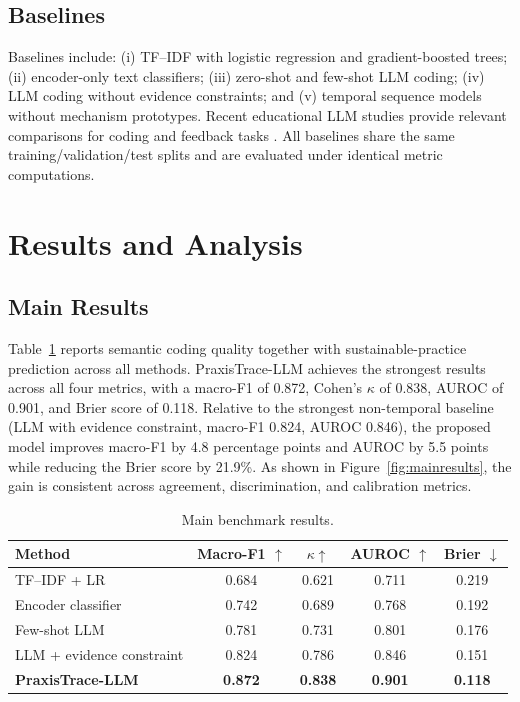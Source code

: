 \documentclass[pdflatex,sn-mathphys-num]{sn-jnl}%
\theoremstyle{thmstyleone}%
\theoremstyle{thmstyletwo}%
\theoremstyle{thmstylethree}%
\begin{document}
\subsection{Baselines}

Baselines include: (i) TF--IDF with logistic regression and gradient-boosted trees; (ii) encoder-only text classifiers; (iii) zero-shot and few-shot LLM coding; (iv) LLM coding without evidence constraints; and (v) temporal sequence models without mechanism prototypes. Recent educational LLM studies provide relevant comparisons for coding and feedback tasks \cite{long2024dialogue,parker2025survey,shin2025cocoding,wang2025bertllama}. All baselines share the same training/validation/test splits and are evaluated under identical metric computations.

\section{Results and Analysis}

\subsection{Main Results}

Table~\ref{tab:main} reports semantic coding quality together with sustainable-practice prediction across all methods. PraxisTrace-LLM achieves the strongest results across all four metrics, with a macro-F1 of 0.872, Cohen's $\kappa$ of 0.838, AUROC of 0.901, and Brier score of 0.118. Relative to the strongest non-temporal baseline (LLM with evidence constraint, macro-F1 0.824, AUROC 0.846), the proposed model improves macro-F1 by 4.8 percentage points and AUROC by 5.5 points while reducing the Brier score by 21.9\%. As shown in Figure~\ref{fig:mainresults}, the gain is consistent across agreement, discrimination, and calibration metrics.

\begin{table}[t]
\centering
\caption{Main benchmark results.}
\label{tab:main}
\begin{tabular}{lcccc}
\toprule
Method & Macro-F1 $\uparrow$ & $\kappa\uparrow$ & AUROC $\uparrow$ & Brier $\downarrow$\\
\midrule
TF--IDF + LR & 0.684 & 0.621 & 0.711 & 0.219\\
Encoder classifier & 0.742 & 0.689 & 0.768 & 0.192\\
Few-shot LLM & 0.781 & 0.731 & 0.801 & 0.176\\
LLM + evidence constraint & 0.824 & 0.786 & 0.846 & 0.151\\
\textbf{PraxisTrace-LLM} & \textbf{0.872} & \textbf{0.838} & \textbf{0.901} & \textbf{0.118}\\
\bottomrule
\end{tabular}
\end{table}
\end{document}
